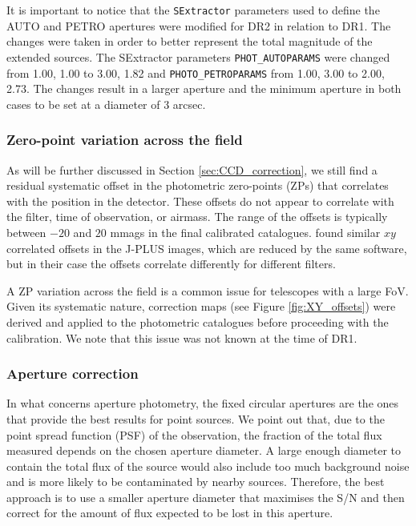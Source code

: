 \documentclass[fleqn,usenatbib]{mnras}
\begin{document}
It is important to notice that the \texttt{SExtractor} parameters used to define the AUTO and PETRO apertures were modified for DR2 in relation to DR1. The changes were taken in order to better represent the total magnitude of the extended sources. The SExtractor parameters \texttt{PHOT\_AUTOPARAMS} were changed from 1.00, 1.00 to 3.00, 1.82 and \texttt{PHOTO\_PETROPARAMS} from 1.00, 3.00 to 2.00, 2.73. The changes result in a larger aperture and the minimum aperture in both cases to be set at a diameter of 3 arcsec.


\subsubsection{Zero-point variation across the field}

As will be further discussed in Section \ref{sec:CCD_correction}, we still find a residual systematic offset in the photometric zero-points (ZPs) that correlates with the position in the detector. These offsets do not appear to correlate with the filter, time of observation, or airmass. The range of the offsets is typically between $-20$ and $20$ mmags in the final calibrated catalogues. \citet{LopesSanjuan+2019} found similar $xy$ correlated offsets in the J-PLUS images, which are reduced by the same software, but in their case the offsets correlate differently for different filters.

A ZP variation across the field is a common issue for telescopes with a large FoV. Given its systematic nature, correction maps (see Figure \ref{fig:XY_offsets}) were derived and applied to the photometric catalogues before proceeding with the calibration. We note that this issue was not known at the time of DR1.


\subsubsection{Aperture correction}
\label{sec:aper_corr}

In what concerns aperture photometry, the fixed circular apertures are the ones that provide the best results for point sources. We point out that, due to the point spread function (PSF) of the observation, the fraction of the total flux measured depends on the chosen aperture diameter. A large enough diameter to contain the total flux of the source would also include too much background noise and is more likely to be contaminated by nearby sources. Therefore, the best approach is to use a smaller aperture diameter that maximises the  S/N and then correct for the amount of flux expected to be lost in this aperture.
\end{document}
